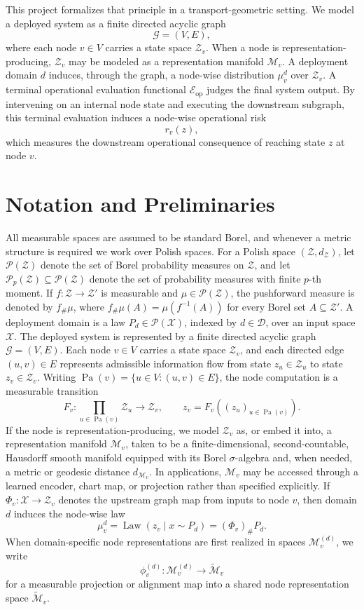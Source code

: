 \documentclass[10pt,twocolumn]{article}
\begin{document}
This project formalizes that principle in a transport-geometric setting. We model a deployed system as a finite directed acyclic graph
\[
\mathcal{G}=(V,E),
\]
where each node $v\in V$ carries a state space $\mathcal{Z}_v$. When a node is representation-producing, $\mathcal{Z}_v$ may be modeled as a representation manifold $\mathcal{M}_v$. A deployment domain $d$ induces, through the graph, a node-wise distribution $\mu_v^d$ over $\mathcal{Z}_v$. A terminal operational evaluation functional $\mathcal{E}_{\mathrm{op}}$ judges the final system output. By intervening on an internal node state and executing the downstream subgraph, this terminal evaluation induces a node-wise operational risk
\[
r_v(z),
\]
which measures the downstream operational consequence of reaching state $z$ at node $v$.

\section{Notation and Preliminaries}

All measurable spaces are assumed to be standard Borel, and whenever a metric structure is required we work over Polish spaces. For a Polish space $(\mathcal{Z},d_{\mathcal{Z}})$, let $\mathcal{P}(\mathcal{Z})$ denote the set of Borel probability measures on $\mathcal{Z}$, and let $\mathcal{P}_p(\mathcal{Z})\subseteq\mathcal{P}(\mathcal{Z})$ denote the set of probability measures with finite $p$-th moment. If $f:\mathcal{Z}\rightarrow\mathcal{Z}'$ is measurable and $\mu\in\mathcal{P}(\mathcal{Z})$, the pushforward measure is denoted by $f_{\#}\mu$, where $f_{\#}\mu(A)=\mu(f^{-1}(A))$ for every Borel set $A\subseteq\mathcal{Z}'$. A deployment domain is a law $P_d\in\mathcal{P}(\mathcal{X})$, indexed by $d\in\mathcal{D}$, over an input space $\mathcal{X}$. The deployed system is represented by a finite directed acyclic graph $\mathcal{G}=(V,E)$. Each node $v\in V$ carries a state space $\mathcal{Z}_v$, and each directed edge $(u,v)\in E$ represents admissible information flow from state $z_u\in\mathcal{Z}_u$ to state $z_v\in\mathcal{Z}_v$. Writing $\operatorname{Pa}(v)=\{u\in V:(u,v)\in E\}$, the node computation is a measurable transition
\[
F_v:\prod_{u\in\operatorname{Pa}(v)}\mathcal{Z}_u\rightarrow\mathcal{Z}_v,
\qquad
z_v=F_v((z_u)_{u\in\operatorname{Pa}(v)}).
\]
If the node is representation-producing, we model $\mathcal{Z}_v$ as, or embed it into, a representation manifold $\mathcal{M}_v$, taken to be a finite-dimensional, second-countable, Hausdorff smooth manifold equipped with its Borel $\sigma$-algebra and, when needed, a metric or geodesic distance $d_{\mathcal{M}_v}$. In applications, $\mathcal{M}_v$ may be accessed through a learned encoder, chart map, or projection rather than specified explicitly. If $\Phi_v:\mathcal{X}\rightarrow\mathcal{Z}_v$ denotes the upstream graph map from inputs to node $v$, then domain $d$ induces the node-wise law
\[
\mu_v^d=\operatorname{Law}(z_v\mid x\sim P_d)=(\Phi_v)_{\#}P_d.
\]
When domain-specific node representations are first realized in spaces $\mathcal{M}_v^{(d)}$, we write
\[
\phi_v^{(d)}:\mathcal{M}_v^{(d)}\rightarrow\widetilde{\mathcal{M}}_v
\]
for a measurable projection or alignment map into a shared node representation space $\widetilde{\mathcal{M}}_v$.
\end{document}
